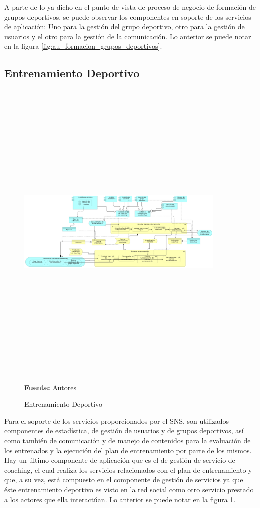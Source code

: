 A parte de lo ya dicho en el punto de vista de proceso de negocio de formación de grupos deportivos, se puede observar los componentes en soporte de los servicios de aplicación: Uno para la gestión del grupo deportivo, otro para la gestión de usuarios y el otro para la gestión de la comunicación. Lo anterior se puede notar en la figura \ref{fig:au_formacion_grupos_deportivos}.

\subsection{Entrenamiento Deportivo}

\begin{figure}[!htb]
  \begin{center}
    \includegraphics[angle=90,width=10cm,height=15cm]{./imagenes/Archimate/vistas/application_usage/entrenamientodeportivo.png}
    \caption{Entrenamiento Deportivo}
    \label{fig:au_entrenamiento_deportivo}
    \textbf{Fuente:}  Autores \\
  \end{center}
\end{figure}

Para el soporte de los servicios proporcionados por el SNS, son utilizados componentes de estadística, de gestión de usuarios y de grupos deportivos, así como también de comunicación y de manejo de contenidos para la evaluación de los entrenados y la ejecución del plan de entrenamiento por parte de los mismos. Hay un último componente de aplicación que es el de gestión de servicio de coaching, el cual realiza los servicios relacionados con el plan de entrenamiento y que, a su vez, está compuesto en el componente de gestión de servicios ya que éste entrenamiento deportivo es visto en la red social como otro servicio prestado a los actores que ella interactúan. Lo anterior se puede notar en la figura \ref{fig:au_entrenamiento_deportivo}.